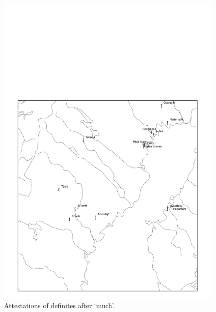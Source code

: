 \begin{figure}[h]

\includegraphics[height=.3\textheight]{figures/15_AttestationsofDefinites}
\caption{Attestations of definites after ‘much’.}
\label{map:12}

\end{figure}


